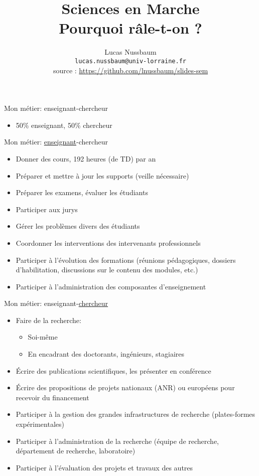 \documentclass[10pt,final,usepdftitle=false]{beamer}
\title[Sciences en Marche]{Sciences en Marche\\[0.5em]Pourquoi râle-t-on ?}
\author[Lucas Nussbaum]{Lucas Nussbaum\\[0.5em] \small  \texttt{lucas.nussbaum@univ-lorraine.fr}\\[0.5em]
source : \url{https://github.com/lnussbaum/slides-sem}}
\date{}
\begin{document}
\frame{\titlepage}

\begin{frame}{Mon métier: enseignant-chercheur}
\begin{itemize}
\item 50\% enseignant, 50\% chercheur
\end{itemize}
\end{frame}

\begin{frame}{Mon métier: \underline{enseignant}-chercheur}
\begin{itemize}
\item Donner des cours, 192 heures (de TD) par an
\smallskip
\item Préparer et mettre à jour les supports (veille nécessaire)
\smallskip
\item Préparer les examens, évaluer les étudiants
\smallskip
\item Participer aux jurys
\smallskip
\item Gérer les problèmes divers des étudiants
\smallskip
\item Coordonner les interventions des intervenants professionnels
\smallskip
\item Participer à l'évolution des formations (réunions pédagogiques, dossiers d'habilitation, discussions sur le contenu des modules, etc.)
\smallskip
\item Participer à l'administration des composantes d'enseignement
\end{itemize}
\end{frame}

\begin{frame}{Mon métier: enseignant-\underline{chercheur}}
\begin{itemize}
\item Faire de la recherche:
	\begin{itemize}
		\item Soi-même
\smallskip
		\item En encadrant des doctorants, ingénieurs, stagiaires
	\end{itemize}
	\smallskip
\item Écrire des publications scientifiques, les présenter en conférence
\smallskip
\item Écrire des propositions de projets nationaux (ANR) ou européens pour recevoir du financement
\smallskip
\item Participer à la gestion des grandes infrastructures de recherche (plates-formes expérimentales)
\smallskip
\item Participer à l'administration de la recherche (équipe de recherche, département de recherche, laboratoire)
\smallskip
\item Participer à l'évaluation des projets et travaux des autres
\end{itemize}
\end{frame}
\end{document}

